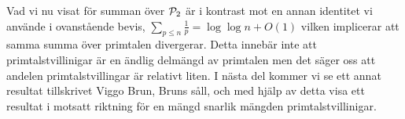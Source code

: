 Vad vi nu visat för summan över \(\P_2\) är i kontrast mot en annan identitet vi använde i ovanstående bevis, \(\sum_{p \leq n} \frac{1}{p} = \log \log n + O(1)\) vilken implicerar att samma summa över primtalen divergerar. Detta innebär inte att primtalstvillinigar är en ändlig delmängd av primtalen men det säger oss att andelen primtalstvillingar är relativt liten. I nästa del kommer vi se ett annat resultat tillskrivet Viggo Brun, Bruns såll, och med hjälp av detta visa ett resultat i motsatt riktning för en mängd snarlik mängden primtalstvillinigar. 



